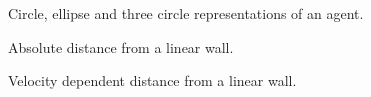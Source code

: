 \documentclass[]{article}
\begin{document}


\begin{figure}[H]
\centering
\begin{tikzpicture}
  [
    point/.style = {draw, circle, fill=white, inner sep=0.5pt}
  ]


\end{tikzpicture}
\caption{Circle, ellipse and three circle representations of an agent.}
\end{figure}

\newpage

\begin{multicols*}{2}

\end{multicols*}


\newpage


\begin{figure}[H]
\centering
\begin{tikzpicture}
  [
    point/.style = {draw, circle, fill=white, inner sep=1.4pt}
  ]


\end{tikzpicture}
\caption{Absolute distance from a linear wall.}
\end{figure}

\begin{figure}[H]
\centering
\begin{tikzpicture}
  [
    point/.style = {draw, circle, fill=white, inner sep=1.4pt}
  ]


\end{tikzpicture}
\caption{Velocity dependent distance from a linear wall.}
\end{figure}


\begin{multicols*}{2}

\end{multicols*}


\newpage


\begin{multicols*}{2}



\end{multicols*}

\end{document}
